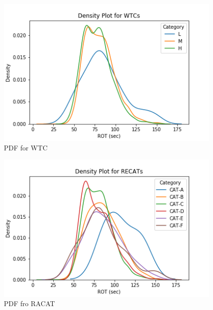 \begin{figure}
    \centering
    \includegraphics[width=1\textwidth]{graphics/pdf_wtc.png}
    \caption[PDF for WTC]{PDF for WTC}
    \label{fig:pdf_wtc}
\end{figure}

\begin{figure}
    \centering
    \includegraphics[width=1\textwidth]{graphics/pdf_recats.png}
    \caption[PDF for RACAT]{PDF fro RACAT}
    \label{fig:pdf_recats}
\end{figure}

